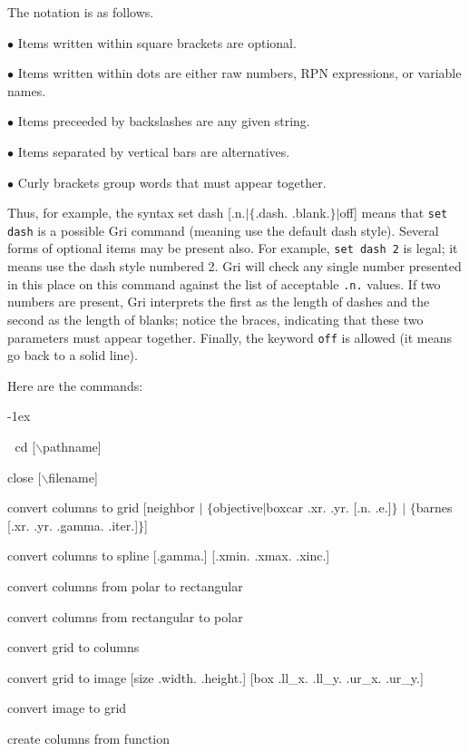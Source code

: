 The notation is as follows.  

$\bullet$ Items written within square brackets are optional.

$\bullet$ Items written within dots are either raw numbers, RPN
expressions, or variable names.

$\bullet$ Items preceeded by backslashes are any given string.

$\bullet$ Items separated by vertical bars are alternatives.

$\bullet$ Curly brackets group words that must appear together.

Thus, for example, the syntax
\beginexample
    set dash [.n.$\mid$$\lbrace$.dash. .blank.$\rbrace$$\mid$off]
\endexample
means that {\tt set dash} is a possible Gri command (meaning use the
default dash style).  Several forms of optional items may be present
also.  For example, {\tt set dash 2} is legal; it means use the dash
style numbered 2.  Gri will check any single number presented in this
place on this command against the list of acceptable {\tt .n.} values.
If two numbers are present, Gri interprets the first as the length of
dashes and the second as the length of blanks; notice the braces,
indicating that these two parameters must appear together.  Finally,
the keyword {\tt off} is allowed (it means go back to a solid line).


\bigskip
Here are the commands:
\smallskip

\parindent -1ex

\beginexample


cd [$\backslash$pathname]

close [$\backslash$filename]

convert columns to grid [neighbor $\mid$ $\lbrace$objective$\mid$boxcar .xr. .yr. [.n. .e.]$\rbrace$ $\mid$ $\lbrace$barnes [.xr. .yr. .gamma. .iter.]$\rbrace$]

convert columns to spline [.gamma.] [.xmin. .xmax. .xinc.]

convert columns from polar to rectangular

convert columns from rectangular to polar

convert grid to columns

convert grid to image [size .width. .height.] [box .ll\_x. .ll\_y. .ur\_x. .ur\_y.]

convert image to grid

create columns from function

